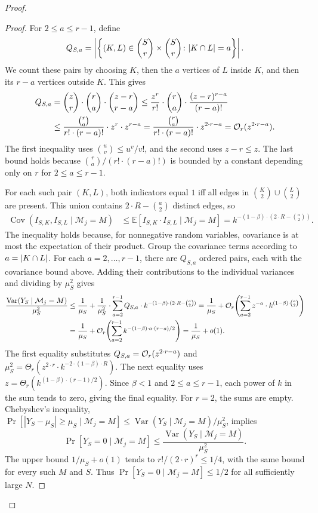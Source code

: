 \begin{proof}
\begin{proof}
    For $2\leq a\leq r-1$, define
    \[
        Q_{S,a}=\mathopen{}\left| \left\{(K,L)\in\binom{S}{r}\times\binom{S}{r}\colon \mathopen{}\left| K\cap L \right|=a\right\} \right|.
    \]
    We count these pairs by choosing $K$, then the $a$ vertices of $L$ inside $K$, and then its $r-a$ vertices outside $K$. This gives
    \begin{align*}
        Q_{S,a}&=\binom{z}{r}\cdot\binom{r}{a}\cdot\binom{z-r}{r-a}\leq\frac{z^r}{r!}\cdot\binom{r}{a}\cdot\frac{(z-r)^{r-a}}{(r-a)!}\\
        &\leq\frac{\binom{r}{a}}{r!\cdot(r-a)!}\cdot z^r\cdot z^{r-a}=\frac{\binom{r}{a}}{r!\cdot(r-a)!}\cdot z^{2\cdot r-a}
        =\mathcal{O}_r(z^{2\cdot r-a}).
    \end{align*}
    The first inequality uses $\binom{u}{v}\leq u^v/v!$, and the second uses $z-r\leq z$. The last bound holds because $\binom{r}{a}/(r!\cdot(r-a)!)$ is bounded by a constant depending only on $r$ for $2\leq a\leq r-1$.

    For each such pair $(K,L)$, both indicators equal $1$ iff all edges in $\binom{K}{2}\cup\binom{L}{2}$ are present. This union contains $2\cdot R-\binom{a}{2}$ distinct edges, so
    \begin{align*}
        \operatorname{Cov}(I_{S,K},I_{S,L}\mid\mathcal M_j=M)
        &\leq\mathbb{E}[I_{S,K}\cdot I_{S,L}\mid\mathcal M_j=M]=k^{-(1-\beta)\cdot(2\cdot R-\binom{a}{2})}.
    \end{align*}
    The inequality holds because, for nonnegative random variables, covariance is at most the expectation of their product.
    Group the covariance terms according to $a=\mathopen{}\left| K\cap L \right|$. For each $a=2,\ldots,r-1$, there are $Q_{S,a}$ ordered pairs, each with the covariance bound above. Adding their contributions to the individual variances and dividing by $\mu_S^2$ gives
    \begin{align*}
        \frac{\operatorname{Var}(Y_S\mid\mathcal M_j=M)}{\mu_S^2}
        &\leq\frac{1}{\mu_S}+\frac{1}{\mu_S^2}\cdot\sum_{a=2}^{r-1}Q_{S,a}\cdot k^{-(1-\beta)\cdot(2\cdot R-\binom{a}{2})}=\frac{1}{\mu_S}+\mathcal{O}_r\mathopen{}\left( \sum_{a=2}^{r-1}z^{-a}\cdot k^{(1-\beta)\cdot\binom{a}{2}} \right)\\
        &=\frac{1}{\mu_S}+\mathcal{O}_r\mathopen{}\left( \sum_{a=2}^{r-1}k^{-(1-\beta)\cdot a\cdot(r-a)/2} \right)=\frac{1}{\mu_S}+o(1).
    \end{align*}
    The first equality substitutes $Q_{S,a}=\mathcal{O}_r(z^{2\cdot r-a})$ and $\mu_S^2=\Theta_r(z^{2\cdot r}\cdot k^{-2\cdot(1-\beta)\cdot R})$. The next equality uses $z=\Theta_r(k^{(1-\beta)\cdot(r-1)/2})$. Since $\beta<1$ and $2\leq a\leq r-1$, each power of $k$ in the sum tends to zero, giving the final equality. For $r=2$, the sums are empty.
    Chebyshev's inequality, $\Pr[|Y_S-\mu_S|\geq\mu_S\mid\mathcal M_j=M]\leq\operatorname{Var}(Y_S\mid\mathcal M_j=M)/\mu_S^2$, implies
    \[
        \Pr[Y_S=0\mid\mathcal M_j=M]
        \leq\frac{\operatorname{Var}(Y_S\mid\mathcal M_j=M)}{\mu_S^2}.
    \]
    The upper bound $1/\mu_S+o(1)$ tends to $r!/(2\cdot r)^r\leq1/4$, with the same bound for every such $M$ and $S$. Thus $\Pr[Y_S=0\mid\mathcal M_j=M]\leq1/2$ for all sufficiently large $N$.
    \end{proof}


\end{proof}
